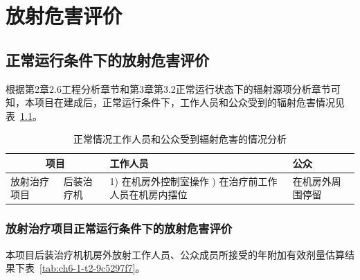 \chapter{放射危害评价}

\section{正常运行条件下的放射危害评价}

根据第2章2.6工程分析章节和第3章第3.2正常运行状态下的辐射源项分析章节可知，本项目在建成后，正常运行条件下，工作人员和公众受到的辐射危害情况见表~\ref{tab:ch6-1-t1-a18f249f}。


\begin{table}[H]
\centering
\caption{正常情况工作人员和公众受到辐射危害的情况分析}
\label{tab:ch6-1-t1-a18f249f}
\begin{tabular}{|p{2.5cm}|p{2.5cm}|p{6cm}|p{2.5cm}|}
\hline
\multicolumn{2}{|c|}{项目} & 工作人员 & 公众 \\
\hline
放射治疗项目 & 后装治疗机 & 
1) 在机房外控制室操作 \newline
2) 在治疗前工作人员在机房内摆位 & 
在机房外周围停留 \\
\hline
\end{tabular}
\end{table}


\subsection{放射治疗项目正常运行条件下的放射危害评价}

本项目后装治疗机机房外放射工作人员、公众成员所接受的年附加有效剂量估算结果下表~\ref{tab:ch6-1-t2-9c5297f7}。


